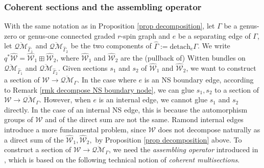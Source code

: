 \documentclass[11pt]{amsart}
\theoremstyle{definition}
\theoremstyle{remark}
\newcommand{\oQMb}{{\overline{\mathcal{QM}}}}
\newcommand{\<}{\left<}
\renewcommand{\>}{\right>}
\numberwithin{equation}{section}
\begin{document}
\subsubsection{Coherent sections and the assembling operator}\label{sec ass} 

   With the same notation as in Proposition \ref{prop decomposition}, let $\Gamma$ be a genus-zero or genus-one connected graded $r$-spin graph and $e$ be a separating edge %
of $\Gamma$, let $\oQMb_{\widehat{\Gamma}_1}$ %
and $\oQMb_{\widehat{\Gamma}_2}$ be the two components of $\widehat\Gamma:={\text{detach} }_e{\Gamma}$. We write $q^*\widehat{\mathcal{W}} = \widehat{\mathcal{W}}_1 \boxplus \widehat{\mathcal{W}}_2$, where $\widehat{\mathcal{W}}_1$ and $\widehat{\mathcal{W}}_2$ are the (pullback of) Witten bundles on $\oQMb_{\widehat{\Gamma}_1}$ and $\oQMb_{\widehat{\Gamma}_2}$. 
   Given sections $s_1$ and $s_2$ of $\widehat{\mathcal{W}}_1$ and $\widehat{\mathcal{W}}_2$, we want to construct a section of $\mathcal W \to \oQMb_\Gamma$. In the case where $e$ is an NS boundary edge, according to Remark \ref{rmk decompose NS boundary node}, we can glue $s_1,s_2$ 
 to a section of $\mathcal W \to \oQMb_\Gamma$. However, when $e$ is an internal edge, we cannot glue $s_1$ and $s_2$ directly. In the case of an internal NS edge, this is because the automorphism groups of ${\mathcal{W}}$ and of the direct sum are not the same. Ramond internal edges introduce a more fundamental problem, since ${\mathcal{W}}$ does not decompose naturally as a direct sum of %
the $\widehat{\mathcal{W}}_1,\widehat{\mathcal{W}}_2,$ by %
Proposition \ref{prop decomposition} above. To construct a section of $\mathcal W \to \overline{\mathcal{QM}}_\Gamma$, we need the \textit{assembling operator} introduced in \cite{BCT2}, which is based on the following technical notion of \textit{coherent multisections}. 
  
\end{document}
